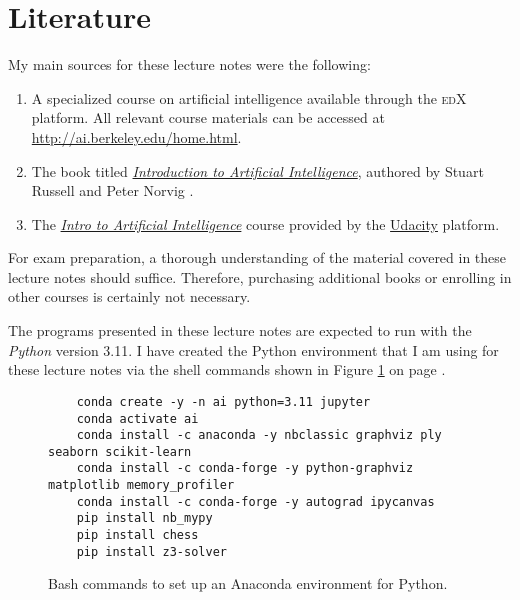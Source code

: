 \section{Literature}
My main sources for these lecture notes were the following:
\begin{enumerate}
    \item A specialized course on artificial intelligence available through the \textsc{edX} platform. All
          relevant course materials can be accessed at
          \href{http://ai.berkeley.edu/home.html}{http://ai.berkeley.edu/home.html}. 
    \item The book titled
          \href{https://www.amazon.de/Artificial-Intelligence-Modern-Approach-Global/dp/1292401133/}{\textit{Introduction to Artificial Intelligence}},
          authored by Stuart Russell and Peter Norvig \cite{russell:2020}. 
    \item The \href{https://www.udacity.com/course/intro-to-artificial-intelligence--cs271}{\textit{Intro to
          Artificial Intelligence}} course provided by the \href{https://www.udacity.com}{Udacity} platform. 
\end{enumerate}
For exam preparation, a thorough understanding of the material covered in these lecture notes should
suffice. Therefore, purchasing additional books or enrolling in other courses is certainly not necessary.

\remark
The programs presented in these lecture notes are expected to run with the \textsl{Python} version 3.11.
I have created the Python environment that I am using for these lecture notes via the shell commands shown in
Figure \ref{fig:ai.sh} on page \pageref{fig:ai.sh}.

\begin{figure}[!ht]
\centering
\begin{verbatim}
    conda create -y -n ai python=3.11 jupyter
    conda activate ai
    conda install -c anaconda -y nbclassic graphviz ply seaborn scikit-learn 
    conda install -c conda-forge -y python-graphviz matplotlib memory_profiler
    conda install -c conda-forge -y autograd ipycanvas 
    pip install nb_mypy
    pip install chess 
    pip install z3-solver
\end{verbatim}
\vspace*{-0.3cm}
\caption{Bash commands to set up an Anaconda environment for Python.}
\label{fig:ai.sh}
\end{figure}



